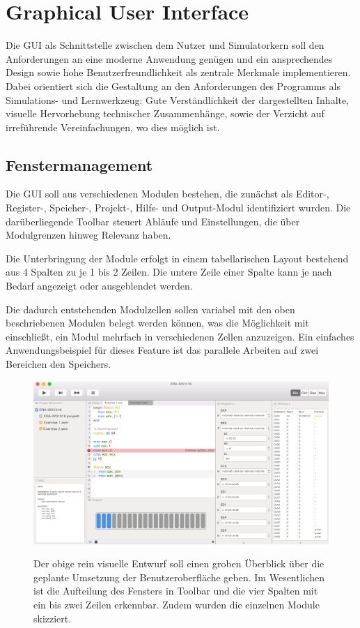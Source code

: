 \chapter{Graphical User Interface}

Die GUI als Schnittstelle zwischen dem Nutzer und Simulatorkern soll den Anforderungen an eine moderne Anwendung genügen und ein ansprechendes Design sowie hohe Benutzerfreundlichkeit als zentrale Merkmale implementieren. Dabei orientiert sich die Gestaltung an den Anforderungen des Programms als Simulations- und Lernwerkzeug: Gute Verständlichkeit der dargestellten Inhalte, visuelle Hervorhebung technischer Zusammenhänge, sowie der Verzicht auf irreführende Vereinfachungen, wo dies möglich ist.


\section{Fenstermanagement}

Die GUI soll aus verschiedenen Modulen bestehen, die zunächst als Editor-, Register-, Speicher-, Projekt-, Hilfs- und Output-Modul identifiziert wurden. Die darüberliegende Toolbar steuert Abläufe und Einstellungen, die über Modulgrenzen hinweg Relevanz haben.

Die Unterbringung der Module erfolgt in einem tabellarischen Layout bestehend aus 4 Spalten zu je 1 bis 2 Zeilen. Die untere Zeile einer Spalte kann je nach Bedarf angezeigt oder ausgeblendet werden.

Die dadurch entstehenden Modulzellen sollen variabel mit den oben beschriebenen Modulen belegt werden können, was die Möglichkeit mit einschließt, ein Modul mehrfach in verschiedenen Zellen anzuzeigen. Ein einfaches Anwendungsbeispiel für dieses Feature ist das parallele Arbeiten auf zwei Bereichen den Speichers.

\begin{figure}
  \includegraphics[width=\textwidth]{../ui/figures/mockup}
  \label{fig:Mockup}
  \caption{Der obige rein visuelle Entwurf soll einen groben Überblick über die geplante Umsetzung der Benutzeroberfläche geben. Im Wesentlichen ist die Aufteilung des Fensters in Toolbar und die vier Spalten mit ein bis zwei Zeilen erkennbar. Zudem wurden die einzelnen Module skizziert.}
\end{figure}

